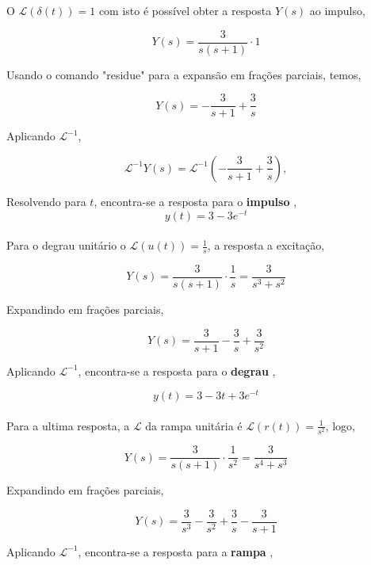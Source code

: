 \documentclass[a4paper, 10pt]{article}
\begin{document}
\begin{list}{\textbf{Questão .}}{
\setlength{\labelwidth}{-2mm} \setlength{\parsep}{0mm}
\setlength{\topsep}{0mm} \setlength{\leftmargin}{0mm}}
\begin{enumerate}
            O $\mathcal{L}(\delta(t)) = 1$ com isto é possível obter a resposta 
            $Y(s)$ ao impulso, 
    
            $$
                Y(s) = \frac{3}{s(s+1)} \cdot 1
            $$

            Usando o comando "residue" para a expansão em frações parciais, temos,

            $$
                Y(s) = -\frac{3}{s+1} + \frac{3}{s}
            $$

            Aplicando $\mathcal{L}^{-1}$,

            $$
            \mathcal{L}^{-1}Y(s)=\mathcal{L}^{-1}( -\frac{3}{s+1} + \frac{3}{s} ),
            $$

            Resolvendo para $t$, encontra-se a resposta para o \textbf{impulso} ,
            \begin{equation}
                y(t) = 3 - 3 e^{-t}
            \end{equation}\\

            

            Para o degrau unitário o $\mathcal{L}(u(t)) = \frac{1}{s}$, a resposta a excitação,

            $$
            Y(s) = \frac{3}{s(s+1)} \cdot \frac{1}{s} = \frac{3}{s^3+s^2}
            $$

            Expandindo em frações parciais,

            $$
            Y(s) = \frac{3}{s+1} - \frac{3}{s} + \frac{3}{s^2} 
            $$

            Aplicando $\mathcal{L}^{-1}$, encontra-se a resposta para o \textbf{degrau} ,

            \begin{equation}
            y(t) = 3 - 3 t + 3 e^{-t}
            \end{equation}\\


            Para a ultima resposta, a $\mathcal{L}$ da rampa unitária é $\mathcal{L}(r(t)) = \frac{1}{s^2}$, logo,

            $$
            Y(s) = \frac{3}{s(s+1)} \cdot \frac{1}{s^2} = \frac{3}{s^4 + s^3}
            $$

            Expandindo em frações parciais,

            $$
            Y(s) = \frac{3}{s^3} - \frac{3}{s^2} + \frac{3}{s} - \frac{3}{s+1}
            $$

            Aplicando $\mathcal{L}^{-1}$, encontra-se a resposta para a \textbf{rampa} ,


\end{enumerate}
\end{list}
\end{document}
